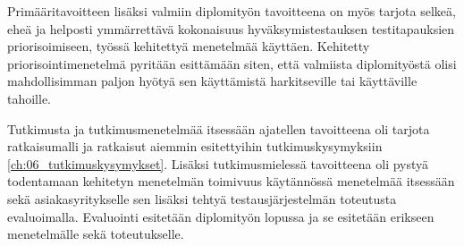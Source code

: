   Primääritavoitteen lisäksi valmiin diplomityön tavoitteena on myös tarjota selkeä, eheä ja helposti ymmärrettävä kokonaisuus hyväksymistestauksen testitapauksien priorisoimiseen, työssä kehitettyä menetelmää käyttäen.
  Kehitetty priorisointimenetelmä pyritään esittämään siten, että valmiista diplomityöstä olisi mahdollisimman paljon hyötyä sen käyttämistä harkitseville tai käyttäville tahoille.

  Tutkimusta ja tutkimusmenetelmää itsessään ajatellen tavoitteena oli tarjota ratkaisumalli ja ratkaisut aiemmin esitettyihin tutkimuskysymyksiin \ref{ch:06_tutkimuskysymykset}.
  Lisäksi tutkimusmielessä tavoitteena oli pystyä todentamaan kehitetyn menetelmän toimivuus käytännössä menetelmää itsessään sekä asiakasyritykselle sen lisäksi tehtyä testausjärjestelmän toteutusta evaluoimalla.
  Evaluointi esitetään diplomityön lopussa ja se esitetään erikseen menetelmälle sekä toteutukselle.

